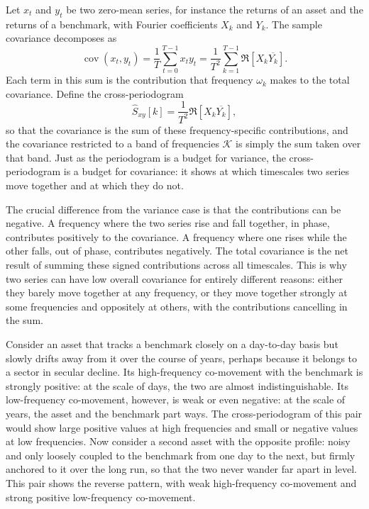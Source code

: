 \documentclass[12pt,a4paper]{article}
\begin{document}
Let $x_t$ and $y_t$ be two zero-mean series, for instance the returns of
an asset and the returns of a benchmark, with Fourier coefficients $X_k$
and $Y_k$. The sample covariance decomposes as
\begin{equation}
    \operatorname{cov}(x_t, y_t) = \frac{1}{T} \sum_{t=0}^{T-1} x_t y_t
    = \frac{1}{T^2} \sum_{k=1}^{T-1} \Re[X_k \overline{Y_k}].
\end{equation}
Each term in this sum is the contribution that frequency $\omega_k$ makes
to the total covariance. Define the cross-periodogram
\begin{equation}
    \hat{S}_{xy}[k] = \frac{1}{T^2} \Re[X_k \overline{Y_k}],
\end{equation}
so that the covariance is the sum of these frequency-specific
contributions, and the covariance restricted to a band of frequencies
$\mathcal{K}$ is simply the sum taken over that band. Just as the
periodogram is a budget for variance, the cross-periodogram is a budget
for covariance: it shows at which timescales two series move together and
at which they do not.

The crucial difference from the variance case is that the contributions
can be negative. A frequency where the two series rise and fall together,
in phase, contributes positively to the covariance. A frequency where one
rises while the other falls, out of phase, contributes negatively. The
total covariance is the net result of summing these signed contributions
across all timescales. This is why two series can have low overall
covariance for entirely different reasons: either they barely move
together at any frequency, or they move together strongly at some
frequencies and oppositely at others, with the contributions cancelling
in the sum.

Consider an asset that tracks a benchmark closely on a day-to-day basis
but slowly drifts away from it over the course of years, perhaps because
it belongs to a sector in secular decline. Its high-frequency co-movement
with the benchmark is strongly positive: at the scale of days, the two
are almost indistinguishable. Its low-frequency co-movement, however, is
weak or even negative: at the scale of years, the asset and the benchmark
part ways. The cross-periodogram of this pair would show large positive
values at high frequencies and small or negative values at low
frequencies. Now consider a second asset with the opposite profile: noisy
and only loosely coupled to the benchmark from one day to the next, but
firmly anchored to it over the long run, so that the two never wander far
apart in level. This pair shows the reverse pattern, with weak
high-frequency co-movement and strong positive low-frequency co-movement.
\end{document}
